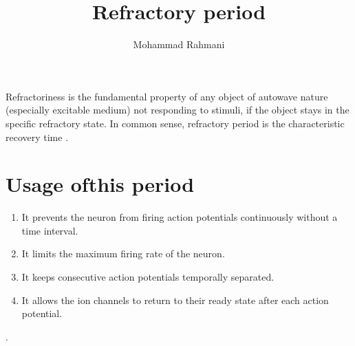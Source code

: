 \documentclass[a4paper]{article}
\title{Refractory period}
\date{}
\author{Mohammad Rahmani}
\begin{document}
    \maketitle
    Refractoriness is the fundamental property of any object of autowave nature (especially excitable medium) not responding to stimuli, if the object stays in the specific refractory state. In common sense, refractory period is the characteristic recovery time .
    
    
    \section{Usage ofthis period}
        \begin{enumerate}
            \item It prevents the neuron from firing action potentials continuously without a time interval.
            \item It limits the maximum firing rate of the neuron.
            \item It keeps consecutive action potentials temporally separated.
            \item It allows the ion channels to return to their ready state after each action potential.
        \end{enumerate}
        .
%    
%    
\end{document}
